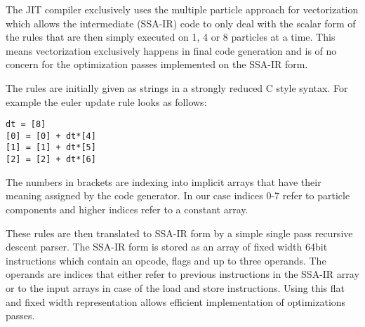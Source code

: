 The JIT compiler exclusively uses the multiple particle approach for vectorization which allows the intermediate (SSA-IR) code to only deal with the scalar form of the rules that are then simply executed on 1, 4 or 8 particles at a time. This means vectorization exclusively happens in final code generation and is of no concern for the optimization passes implemented on the SSA-IR form.

The rules are initially given as strings in a strongly reduced C style syntax. For example the euler update rule looks as follows:
\begin{lstlisting}
dt = [8]
[0] = [0] + dt*[4]
[1] = [1] + dt*[5]
[2] = [2] + dt*[6]
\end{lstlisting}
The numbers in brackets are indexing into implicit arrays that have their meaning assigned by the code generator. In our case indices 0-7 refer to particle components and higher indices refer to a constant array.

These rules are then translated to SSA-IR form by a simple single pass recursive descent parser. The SSA-IR form is stored as an array of fixed width 64bit instructions which contain an opcode, flags and up to three operands. The operands are indices that either refer to previous instructions in the SSA-IR array or to the input arrays in case of the load and store instructions. Using this flat and fixed width representation allows efficient implementation of optimizations passes.

